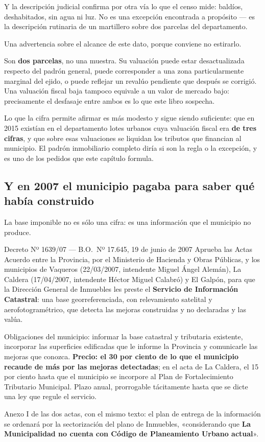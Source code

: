 Y la descripción judicial confirma por otra vía lo que el censo mide: baldíos, deshabitados, sin agua ni luz. No es una excepción encontrada a propósito --- es la descripción rutinaria de un martillero sobre dos parcelas del departamento.

\begin{cautela}
Una advertencia sobre el alcance de este dato, porque conviene no estirarlo.

Son \textbf{dos parcelas}, no una muestra. Su valuación puede estar desactualizada respecto del padrón general, puede corresponder a una zona particularmente marginal del ejido, o puede reflejar un revalúo pendiente que después se corrigió. Una valuación fiscal baja tampoco equivale a un valor de mercado bajo: precisamente el desfasaje entre ambos es lo que este libro sospecha.

Lo que la cifra permite afirmar es más modesto y sigue siendo suficiente: que en 2015 existían en el departamento lotes urbanos cuya valuación fiscal era \textbf{de tres cifras}, y que sobre esas valuaciones se liquidan los tributos que financian al municipio. El padrón inmobiliario completo diría si son la regla o la excepción, y es uno de los pedidos que este capítulo formula.
\end{cautela}


\subsection*{Y en 2007 el municipio pagaba para saber qué había construido}

La base imponible no es sólo una cifra: es una información que el municipio no produce.

\begin{ficha}{Decreto Nº 1639/07 --- B.O.\ Nº 17.645, 19 de junio de 2007}
Aprueba las Actas Acuerdo entre la Provincia, por el Ministerio de Hacienda y Obras Públicas, y los municipios de Vaqueros (22/03/2007, intendente Miguel Ángel Alemán), La Caldera (17/04/2007, intendente Héctor Miguel Calabró) y El Galpón, para que la Dirección General de Inmuebles les preste el \textbf{Servicio de Información Catastral}: una base georreferenciada, con relevamiento satelital y aerofotogramétrico, que detecta las mejoras construidas y no declaradas y las valúa.

Obligaciones del municipio: informar la base catastral y tributaria existente, incorporar las superficies edificadas que le informe la Provincia y comunicarle las mejoras que conozca. \textbf{Precio: el 30 por ciento de lo que el municipio recaude de más por las mejoras detectadas}; en el acta de La Caldera, el 15 por ciento hasta que el municipio se incorpore al Plan de Fortalecimiento Tributario Municipal. Plazo anual, prorrogable tácitamente hasta que se dicte una ley que regule el servicio.

Anexo I de las dos actas, con el mismo texto: el plan de entrega de la información se ordenará por la sectorización del plano de Inmuebles, «considerando que \textbf{La Municipalidad no cuenta con Código de Planeamiento Urbano actual}».
\end{ficha}

